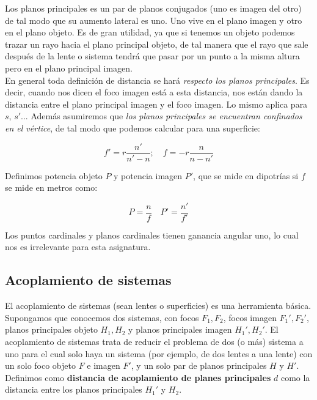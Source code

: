\documentclass[12pt]{article}
\numberwithin{equation}{section}
\numberwithin{figure}{section}
\begin{document}
Los planos principales es un par de planos conjugados (uno es imagen del otro) de tal modo que su aumento lateral es uno. Uno vive en el plano imagen y otro en el plano objeto. Es de gran utilidad, ya que si tenemos un objeto podemos trazar un rayo hacia el plano principal objeto, de tal manera que el rayo que sale después de la lente o sistema tendrá que pasar por un punto a la misma altura pero en el plano principal imagen. \\

En general toda definición de distancia se hará \textit{respecto los planos principales}. Es decir, cuando nos dicen el foco imagen está a esta distancia, nos están dando la distancia entre el plano principal imagen y el foco imagen. Lo mismo aplica para $s$, $s'$... Además asumiremos que \textit{los planos principales se encuentran confinados en el vértice}, de tal modo que podemos calcular para una superficie:

\begin{equation}
f' = r \dfrac{n'}{n'-n}; \quad f = -r \dfrac{n}{n-n'}
\end{equation}

Definimos potencia objeto $P$ y potencia imagen $P'$, que se mide en dipotrías si $f$ se mide en metros como:

\begin{equation}
P = \dfrac{n}{f} \quad P' = \dfrac{n'}{f'} \label{Ec:potencia}
\end{equation}

Los puntos cardinales y planos cardinales tienen ganancia angular uno, lo cual nos es irrelevante para esta asignatura.

\subsection{Acoplamiento de sistemas}

El acoplamiento de sistemas (sean lentes o superficies) es una herramienta básica. Supongamos que conocemos dos sistemas, con focos $F_1, F_2$, focos imagen $F_1',F_2'$, planos principales objeto $H_1,H_2$ y planos principales imagen $H_1',H_2'$. El acoplamiento de sistemas trata de reducir el problema de dos (o más) sistema a uno para el cual solo haya un sistema (por ejemplo, de dos lentes a una lente) con un solo foco objeto $F$ e imagen $F'$, y un solo par de planos principales $H$ y $H'$. \\

Definimos como \textbf{distancia de acoplamiento de planes principales} $d$ como la distancia entre los planos principales $H_1'$ y $H_2$. \\
\end{document}
